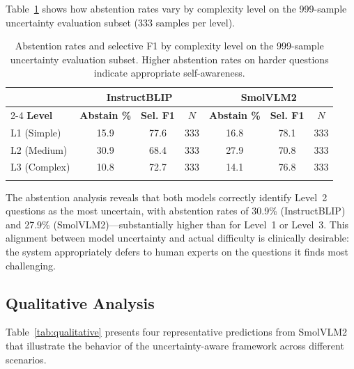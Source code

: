 \documentclass[pdflatex,sn-mathphys-num]{sn-jnl}
\begin{document}
Table~\ref{tab:complexity_abstention} shows how abstention rates vary by complexity level on the 999-sample uncertainty evaluation subset (333 samples per level).

\begin{table}[t]
\caption{Abstention rates and selective F1 by complexity level on the 999-sample uncertainty evaluation subset. Higher abstention rates on harder questions indicate appropriate self-awareness.}\label{tab:complexity_abstention}
\begin{tabular*}{\textwidth}{@{\extracolsep\fill}lcccccc}
\toprule
& \multicolumn{3}{c}{\textbf{InstructBLIP}} & \multicolumn{3}{c}{\textbf{SmolVLM2}} \\
\cmidrule{2-4}\cmidrule{5-7}
\textbf{Level} & \textbf{Abstain \%} & \textbf{Sel. F1} & \textbf{$N$} & \textbf{Abstain \%} & \textbf{Sel. F1} & \textbf{$N$} \\
\midrule
L1 (Simple)  & 15.9 & 77.6 & 333 & 16.8 & 78.1 & 333 \\
L2 (Medium)  & 30.9 & 68.4 & 333 & 27.9 & 70.8 & 333 \\
L3 (Complex) & 10.8 & 72.7 & 333 & 14.1 & 76.8 & 333 \\
\botrule
\end{tabular*}
\end{table}

The abstention analysis reveals that both models correctly identify Level~2 questions as the most uncertain, with abstention rates of 30.9\% (InstructBLIP) and 27.9\% (SmolVLM2)---substantially higher than for Level~1 or Level~3. This alignment between model uncertainty and actual difficulty is clinically desirable: the system appropriately defers to human experts on the questions it finds most challenging.

\subsection{Qualitative Analysis}

Table~\ref{tab:qualitative} presents four representative predictions from SmolVLM2 that illustrate the behavior of the uncertainty-aware framework across different scenarios.
\end{document}
